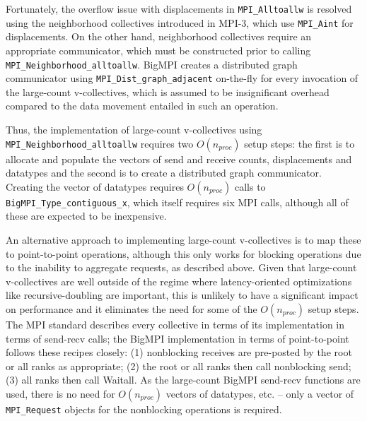 Fortunately, the overflow issue with displacements in \texttt{MPI\_Alltoallw} is
resolved using the neighborhood collectives introduced in MPI-3, which
use \texttt{MPI\_Aint} for displacements.
On the other hand, neighborhood collectives require an appropriate
communicator, which must be constructed prior to calling \texttt{MPI\_Neighborhood\_alltoallw}.
BigMPI creates a distributed graph communicator using \texttt{MPI\_Dist\_graph\_adjacent}
on-the-fly for every invocation of the large-count v-collectives, which is assumed to be
insignificant overhead compared to the data movement entailed in such an operation.

Thus, the implementation of large-count v-collectives using \texttt{MPI\_Neighborhood\_alltoallw} 
requires two $O(n_{proc})$ setup steps: the first is to allocate and populate the vectors of 
send and receive counts, displacements and datatypes and 
the second is to create a distributed graph communicator.
Creating the vector of datatypes requires $O(n_{proc})$ calls to \texttt{BigMPI\_Type\_contiguous\_x},
which itself requires six MPI calls, although all of these are expected to be inexpensive.


An alternative approach to implementing large-count v-collectives is to map
these to point-to-point operations, although this only works for blocking operations
due to the inability to aggregate requests, as described above.
Given that large-count v-collectives are well outside of the regime where latency-oriented 
optimizations like recursive-doubling are important, this is unlikely to have a significant impact 
on performance and it eliminates the need for some of the $O(n_{proc})$ setup steps.
The MPI standard describes every collective in terms of its implementation 
in terms of send-recv calls; the BigMPI implementation in terms of point-to-point
follows these recipes closely:
(1) nonblocking receives are pre-posted by the root or all ranks as appropriate;
(2) the root or all ranks then call nonblocking send; 
(3) all ranks then call Waitall.
As the large-count BigMPI send-recv functions are used, there is no need for
$O(n_{proc})$ vectors of datatypes, etc. -- only a vector of \texttt{MPI\_Request}
objects for the nonblocking operations is required.

